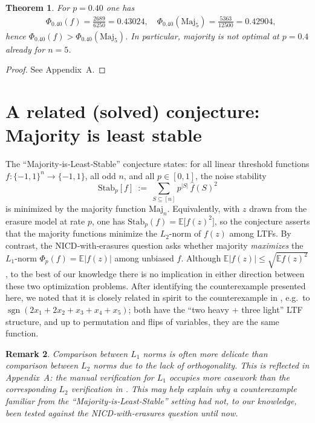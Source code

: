 \documentclass[11pt]{article}
\newtheorem{theorem}{Theorem}
\newtheorem{remark}[theorem]{Remark}
\DeclareMathOperator{\sgn}{sgn}
\newcommand{\Maj}{\mathrm{Maj}}
\begin{document}
\begin{theorem}
For \(p=0.40\) one has
\begin{align*}
&\Phi_{0.40}(f)=\frac{2689}{6250}=0.43024,\quad
\Phi_{0.40}(\Maj_5)=\frac{5363}{12500}=0.42904,
\end{align*}
hence \(\Phi_{0.40}(f)> \Phi_{0.40}(\Maj_5)\). In particular, majority is not optimal at \(p=0.4\) already for \(n=5\).
\end{theorem}
\begin{proof}
See Appendix~A.
\end{proof}

\section{A related (solved) conjecture: Majority is least stable}
The ``Majority‑is‑Least‑Stable'' conjecture states: for all linear threshold functions $f:\{-1,1\}^n\to\{-1,1\}$, all odd $n$, and all $p \in [0,1]$, the noise stability
\[
\mathrm{Stab}_{p}[f]\ :=\ \sum_{S \subseteq [n]}p^{|S|}\,\widehat{f}(S)^2
\]
is minimized by the majority function $\Maj_n$.
Equivalently, with $z$ drawn from the erasure model at rate $p$, one has $\mathrm{Stab}_{p}(f)=\mathbb{E}\big[f(z)^2\big]$, so the conjecture asserts that the majority functions minimize the \(L_2\)-norm of $f(z)$ among LTFs. By contrast, the NICD‑with‑erasures question asks whether majority \emph{maximizes} the \(L_1\)-norm $\Phi_p(f)=\mathbb{E}|f(z)|$ among unbiased $f$. Although \(\mathbb{E}|f(z)| \le \sqrt{\mathbb{E}f(z)^2}\), to the best of our knowledge there is no implication in either direction between these two optimization problems.
After identifying the counterexample presented here, we noted that it is closely related in spirit to the counterexample in \cite{Jain2017}, e.g.\ to $\sgn(2x_1+2x_2+x_3+x_4+x_5)$; both have the ``two heavy + three light'' LTF structure, and up to permutation and flips of variables, they are the same function.

\begin{remark}
Comparison between \(L_1\) norms is often more delicate than comparison between \(L_2\) norms due to the lack of orthogonality. This is reflected in Appendix~A: the manual verification for \(L_1\) occupies more casework than the corresponding \(L_2\) verification in \cite{Jain2017}. This may help explain why a counterexample familiar from the ``Majority‑is‑Least‑Stable'' setting had not, to our knowledge, been tested against the NICD‑with‑erasures question until now.
\end{remark}
\end{document}
